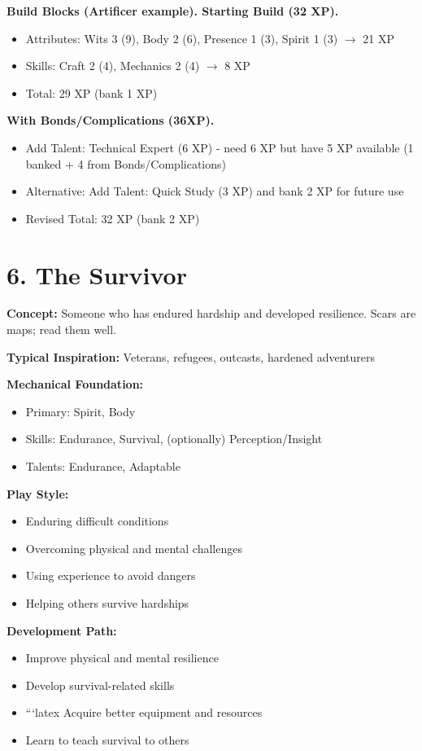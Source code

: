 \documentclass[11pt,twoside,openany]{book}
\begin{document}
\textbf{Build Blocks (Artificer example). Starting Build (32 XP).}
\begin{itemize}
\item Attributes: Wits 3 (9), Body 2 (6), Presence 1 (3), Spirit 1 (3) $\rightarrow$ 21 XP
\item Skills: Craft 2 (4), Mechanics 2 (4) $\rightarrow$ 8 XP
\item Total: 29 XP (bank 1 XP)
\end{itemize}

\textbf{With Bonds/Complications (36XP).}
\begin{itemize}
\item Add Talent: Technical Expert (6 XP) - need 6 XP but have 5 XP available (1 banked + 4 from Bonds/Complications)
\item Alternative: Add Talent: Quick Study (3 XP) and bank 2 XP for future use
\item Revised Total: 32 XP (bank 2 XP)
\end{itemize}

\section*{6. The Survivor} 

\textbf{Concept:} Someone who has endured hardship and developed resilience. Scars are maps; read them well.

\textbf{Typical Inspiration:} Veterans, refugees, outcasts, hardened adventurers

\textbf{Mechanical Foundation:}
\begin{itemize}
\item Primary: Spirit, Body
\item Skills: Endurance, Survival, (optionally) Perception/Insight
\item Talents: Endurance, Adaptable
\end{itemize}

\textbf{Play Style:}
\begin{itemize}
\item Enduring difficult conditions
\item Overcoming physical and mental challenges
\item Using experience to avoid dangers
\item Helping others survive hardships
\end{itemize}

\textbf{Development Path:}
\begin{itemize}
\item Improve physical and mental resilience
\item Develop survival-related skills
\item
```latex
Acquire better equipment and resources
\item Learn to teach survival to others
\end{itemize}
\end{document}

